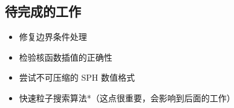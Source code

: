 


\subsection{待完成的工作}

\begin{frame}
    \begin{itemize}
        \item 修复边界条件处理
        \item 检验核函数插值的正确性
        \item 尝试不可压缩的 SPH 数值格式
        \item 快速粒子搜索算法*（这点很重要，会影响到后面的工作）
    \end{itemize}
\end{frame}
